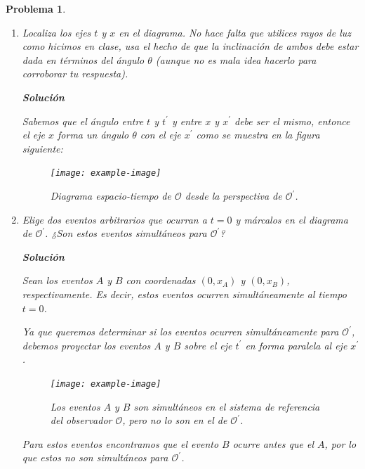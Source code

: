 \documentclass[12pt]{article}
\theoremstyle{break}
\newtheorem{exercise}{Problema}
\theoremstyle{nonumberbreak}
\newcommand*{\observer}{\mathcal{O}}
\newcommand*{\primeobserver}{\mathcal{O}^{\prime}}
\newcommand*{\inlinesol}{\vspace*{10pt}\textbf{Solución}\vspace*{10pt}}
\begin{document}
\begin{exercise}
\begin{enumerate}[label = \alph*)]
            \item Localiza los ejes \(t\) y \(x\) en el diagrama. No hace falta que utilices rayos de luz como hicimos en clase, usa el hecho de que la inclinación de ambos debe estar dada en términos del ángulo \(\theta\) (aunque no es mala idea hacerlo para corroborar tu respuesta).
            
            \inlinesol
            
            Sabemos que el ángulo entre \(t\) y \(t^{\prime}\) y entre \(x\) y \(x^{\prime}\) debe ser el mismo, entonce el eje \(x\) forma un ángulo \(\theta\) con el eje \(x^{\prime}\) como se muestra en la figura siguiente:

            \begin{figure}[htb]
                \centering
                \texttt{[image: example-image]}
                \caption{Diagrama espacio-tiempo de \(\observer\) desde la perspectiva de \(\primeobserver\).}
                \label{fig:spacetime-Observer}
            \end{figure}

            \item Elige dos eventos arbitrarios que ocurran a \(t = 0\) y márcalos en el diagrama de \(\primeobserver\). ¿Son estos eventos simultáneos para \(\primeobserver\)?
            
            \inlinesol
            
            Sean los eventos \(A\) y \(B\) con coordenadas \((0, x_{A})\) y \((0, x_{B})\), respectivamente. Es decir, estos eventos ocurren simultáneamente al tiempo \(t = 0\).

            Ya que queremos determinar si los eventos ocurren simultáneamente para \(\primeobserver\), debemos proyectar los eventos \(A\) y \(B\) sobre el eje \(t^{\prime}\) en forma paralela al eje \(x^{\prime}\).

            \begin{figure}[htb]
                \centering
                \texttt{[image: example-image]}
                \caption{Los eventos \(A\) y \(B\) son simultáneos en el sistema de referencia del observador \(\observer\), pero no lo son en el de \(\primeobserver\).}
                \label{fig:events-simultainety}
            \end{figure}

            Para estos eventos encontramos que el evento \(B\) ocurre antes que el \(A\), por lo que estos no son simultáneos para \(\primeobserver\).


\end{enumerate}
\end{exercise}
\end{document}
